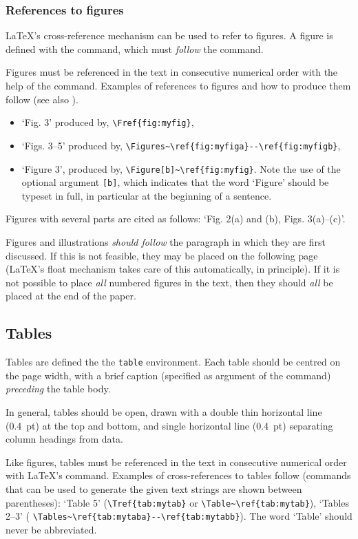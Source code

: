 \documentclass{cernyrep}
\begin{document}
\subsubsection{References to figures}

\LaTeX's cross-reference mechanism can be used to refer to figures.  A
figure is defined with the  command, which must
\emph{follow} the  command.

Figures must be referenced in the text in consecutive numerical order
with the help of the  command. Examples of references to
figures and how to produce them follow (see also ).
\begin{itemize}
\item `Fig. 3' produced by, \eg \verb!\Fref{fig:myfig}!,
\item `Figs. 3--5' produced by, \eg
       \verb!\Figures~\ref{fig:myfiga}--\ref{fig:myfigb}!,
\item `Figure 3', produced by, \eg \verb!\Figure[b]~\ref{fig:myfig}!. 
       Note the use of the optional argument \texttt{[b]}, which
       indicates that the word `Figure' should be typeset in full,
       in particular at the beginning of a sentence.
\end{itemize}
Figures with several parts are cited as follows: `Fig. 2(a) and (b),
Figs. 3(a)--(c)'.

Figures and illustrations \emph{should follow} the paragraph in which
they are first discussed.  If this is not feasible, they may be placed
on the following page (\LaTeX{}'s float mechanism takes care of this
automatically, in principle). If it is not possible to place
\emph{all} numbered figures in the text, then they should \emph{all}
be placed at the end of the paper.

\subsection{Tables}

Tables are defined the the \texttt{table} environment.  Each table
should be centred on the page width, with a brief caption (specified
as argument of the  command) \emph{preceding} the table
body.

In general, tables should be open, drawn with a double thin horizontal
line (0.4~pt) at the top and bottom, and single horizontal line
(0.4~pt) separating column headings from data.

Like figures, tables must be referenced in the text in consecutive
numerical order with \LaTeX's  command. Examples of
cross-references to tables follow (commands that can be used to
generate the given text strings are shown between parentheses): `Table
5' (\eg \verb!\Tref{tab:mytab}! or \verb!\Table~\ref{tab:mytab}!),
`Tables 2--3' (\eg
\verb!\Tables~\ref{tab:mytaba}--\ref{tab:mytabb}!). The word `Table'
should never be abbreviated.
\end{document}
